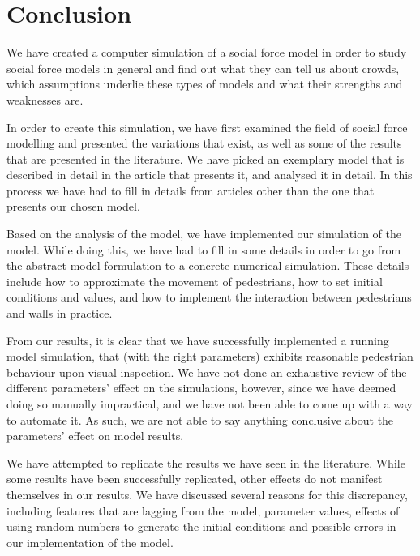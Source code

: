 \section{Conclusion}
\label{sec:conclusion}

We have created a computer simulation of a social force model in order to 
study social force models in general and find out what they can tell us about 
crowds, which assumptions underlie these types of models and what their 
strengths and weaknesses are.

In order to create this simulation, we have first examined the field of social 
force modelling and presented the variations that exist, as well as some of 
the results that are presented in the literature. We have picked an exemplary 
model that is described in detail in the article that presents it, and 
analysed it in detail. In this process we have had to fill in details from 
articles other than the one that presents our chosen model.

Based on the analysis of the model, we have implemented our simulation of the 
model. While doing this, we have had to fill in some details in order to go 
from the abstract model formulation to a concrete numerical simulation. These 
details include how to approximate the movement of pedestrians, how to set 
initial conditions and values, and how to implement the interaction between 
pedestrians and walls in practice.

From our results, it is clear that we have successfully implemented a running 
model simulation, that (with the right parameters) exhibits reasonable 
pedestrian behaviour upon visual inspection. We have not done an exhaustive 
review of the different parameters' effect on the simulations, however, since 
we have deemed doing so manually impractical, and we have not been able to 
come up with a way to automate it. As such, we are not able to say anything 
conclusive about the parameters' effect on model results.

We have attempted to replicate the results we have seen in the literature.  
While some results have been successfully replicated, other effects do not 
manifest themselves in our results. We have discussed several reasons for this 
discrepancy, including features that are lagging from the model, parameter 
values, effects of using random numbers to generate the initial conditions and 
possible errors in our implementation of the model.

